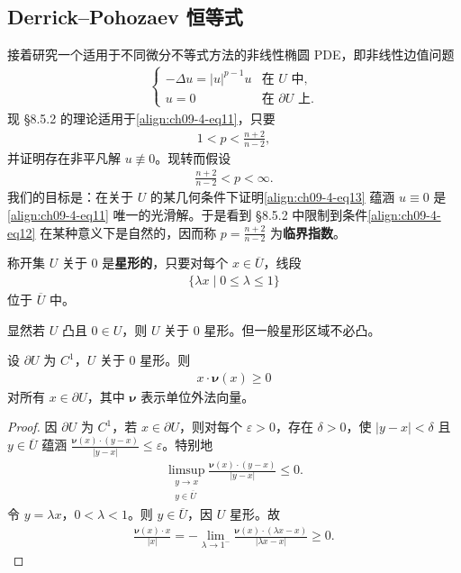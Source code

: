 \documentclass[../../main.tex]{subfiles}
\begin{document}
\subsection{Derrick--Pohozaev 恒等式}\label{subsection:ch09-4-2-DerrickPohozaev}

接着研究一个适用于不同微分不等式方法的非线性椭圆 PDE，即非线性边值问题
\begin{align}
\begin{cases}
-\Delta u=|u|^{p-1}u&\text{在 }U\text{ 中},\\
u=0&\text{在 }\partial U\text{ 上}.
\end{cases}\label{align:ch09-4-eq11}
\end{align}
现 \S8.5.2 的理论适用于\eqref{align:ch09-4-eq11}，只要
\begin{align}
1<p<\frac{n+2}{n-2},\label{align:ch09-4-eq12}
\end{align}
并证明存在非平凡解 $u\not\equiv 0$。现转而假设
\begin{align}
\frac{n+2}{n-2}<p<\infty.\label{align:ch09-4-eq13}
\end{align}
我们的目标是：在关于 $U$ 的某几何条件下证明\eqref{align:ch09-4-eq13} 蕴涵 $u\equiv 0$ 是\eqref{align:ch09-4-eq11} 唯一的光滑解。于是看到 \S8.5.2 中限制到条件\eqref{align:ch09-4-eq12} 在某种意义下是自然的，因而称 $p=\frac{n+2}{n-2}$ 为\textbf{临界指数}。

\begin{definition}\label{definition:ch09-4-星形}
称开集 $U$ 关于 $0$ 是\textbf{星形的}，只要对每个 $x\in\overline{U}$，线段
\begin{align*}
\{\lambda x\mid 0\leqslant\lambda\leqslant 1\}
\end{align*}
位于 $\overline{U}$ 中。
\end{definition}

显然若 $U$ 凸且 $0\in U$，则 $U$ 关于 $0$ 星形。但一般星形区域不必凸。

\begin{lemma}[星形区域的法向量]\label{lemma:ch09-4-星形法向}
设 $\partial U$ 为 $C^1$，$U$ 关于 $0$ 星形。则
\begin{align*}
x\cdot\boldsymbol{\nu}(x)\geqslant 0
\end{align*}
对所有 $x\in\partial U$，其中 $\boldsymbol{\nu}$ 表示单位外法向量。
\begin{proof}
因 $\partial U$ 为 $C^1$，若 $x\in\partial U$，则对每个 $\varepsilon>0$，存在 $\delta>0$，使 $|y-x|<\delta$ 且 $y\in\overline{U}$ 蕴涵 $\frac{\boldsymbol{\nu}(x)\cdot(y-x)}{|y-x|}\leqslant\varepsilon$。特别地
\begin{align*}
\limsup_{\substack{y\to x\\y\in\overline{U}}}\frac{\boldsymbol{\nu}(x)\cdot(y-x)}{|y-x|}\leqslant 0.
\end{align*}
令 $y=\lambda x$，$0<\lambda<1$。则 $y\in\overline{U}$，因 $U$ 星形。故
\begin{align*}
\frac{\boldsymbol{\nu}(x)\cdot x}{|x|}=-\lim_{\lambda\to 1^-}\frac{\boldsymbol{\nu}(x)\cdot(\lambda x-x)}{|\lambda x-x|}\geqslant 0.
\end{align*}
\end{proof}
\end{lemma}
\end{document}
